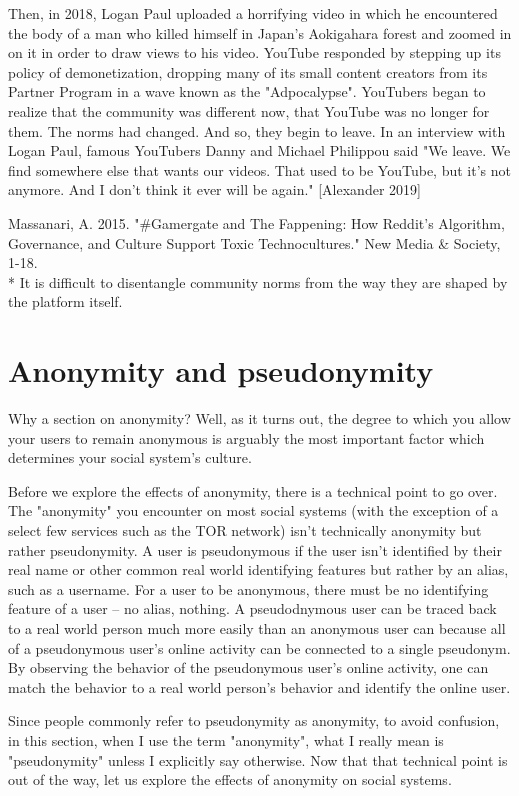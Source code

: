 \documentclass[class=book, crop=false]{standalone}
\begin{document}
Then, in 2018, Logan Paul uploaded a horrifying video in which he encountered the body of a man who killed himself in Japan's Aokigahara forest and zoomed in on it in order to draw views to his video. YouTube responded by stepping up its policy of demonetization, dropping many of its small content creators from its Partner Program in a wave known as the "Adpocalypse". YouTubers began to realize that the community was different now, that YouTube was no longer for them. The norms had changed. And so, they begin to leave. In an interview with Logan Paul, famous YouTubers Danny and Michael Philippou said "We leave. We find somewhere else that wants our videos. That used to be YouTube, but it's not anymore. And I don't think it ever will be again." [Alexander 2019]

Massanari, A. 2015. "#Gamergate and The Fappening: How Reddit's Algorithm, Governance, and Culture Support Toxic Technocultures." New Media \& Society, 1-18.\\
 * It is difficult to disentangle community norms from the way they are shaped by the platform itself.

\section{Anonymity and pseudonymity}

Why a section on anonymity? Well, as it turns out, the degree to which you allow your users to remain anonymous is arguably the most important factor which determines your social system's culture.

Before we explore the effects of anonymity, there is a technical point to go over. The "anonymity" you encounter on most social systems (with the exception of a select few services such as the TOR network) isn't technically anonymity but rather pseudonymity. A user is pseudonymous if the user isn't identified by their real name or other common real world identifying features but rather by an alias, such as a username. For a user to be anonymous, there must be no identifying feature of a user -- no alias, nothing. A pseudodnymous user can be traced back to a real world person much more easily than an anonymous user can because all of a pseudonymous user's online activity can be connected to a single pseudonym. By observing the behavior of the pseudonymous user's online activity, one can match the behavior to a real world person's behavior and identify the online user.

Since people commonly refer to pseudonymity as anonymity, to avoid confusion, in this section, when I use the term "anonymity", what I really mean is "pseudonymity" unless I explicitly say otherwise. Now that that technical point is out of the way, let us explore the effects of anonymity on social systems.
\end{document}
